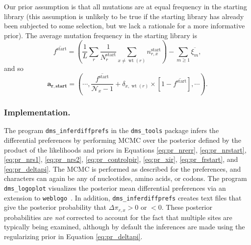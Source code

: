 \documentclass[twocolumn]{bmcart}%
\begin{document}
Our prior assumption is that all mutations are at equal frequency in the starting library (this assumption is unlikely to be true if the starting library has already been subjected to some selection, but we lack a rationale for a more informative prior). The average mutation frequency in the starting library is
\begin{equation}
\label{eq:avgfstart}
\overline{f^{\textrm{start}}} = \left(\frac{1}{L}\sum\limits_r \frac{1}{N_r^{\textrm{start}}}\sum\limits_{x\ne \operatorname{wt}\left(r\right)} n_{r,x}^{\textrm{start}}\right) - \sum\limits_{m \ge 1} \overline{\xi_m},
\end{equation}
and so 
\begin{equation}
\label{eq:arstart}
\boldsymbol{\mathbf{a_{r,\textbf{start}}}}= \left(\cdots, \frac{\overline{f^{\textrm{start}}}}{\mathcal{N}_x - 1} + \delta_{x,\operatorname{wt}\left(r\right)} \times \left[1 - \overline{f^{\textrm{start}}}\right] ,\cdots\right).
\end{equation}

\subsubsection*{Implementation.}
The program \texttt{dms\_inferdiffprefs} in the \texttt{dms\_tools} package infers the differential preferences by performing MCMC over the posterior defined by the product of the likelihoods and priors in Equations \ref{eq:pr_nrerr}, \ref{eq:pr_nrstart}, \ref{eq:pr_nrs1}, \ref{eq:pr_nrs2}, \ref{eq:pr_controlpir}, \ref{eq:pr_xir}, \ref{eq:pr_frstart}, and \ref{eq:pr_deltapi}. The MCMC is performed as described for the preferences, and characters can again be any of nucleotides, amino acids, or codons. The program \texttt{dms\_logoplot} visualizes the posterior mean differential preferences via an extension to \texttt{weblogo}~\cite{crooks2004}. In addition, \texttt{dms\_inferdiffprefs} creates text files that give the posterior probability that $\Delta\pi_{r,x} > 0$ or $< 0$. These posterior probabilities are \emph{not} corrected to account for the fact that multiple sites are typically being examined, although by default the inferences are made using the regularizing prior in Equation \ref{eq:pr_deltapi}.
\end{document}
